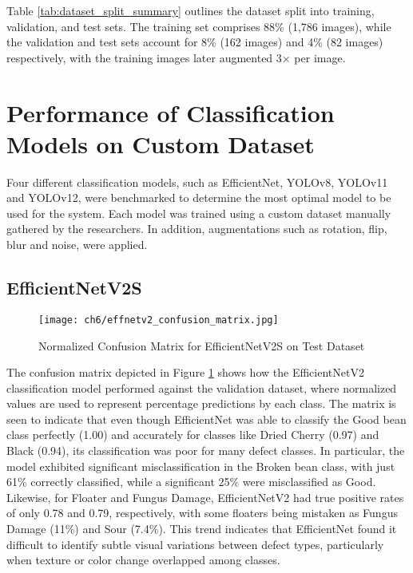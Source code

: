 Table \ref{tab:dataset_split_summary} outlines the dataset split into training, validation, and test sets. The training set comprises 88\% (1,786 images), while the validation and test sets account for 8\% (162 images) and 4\% (82 images) respectively, with the training images later augmented 3× per image.

\section{Performance of Classification Models on Custom Dataset}
\label{sec:perf_custom_dataset}
Four different classification models, such as EfficientNet, YOLOv8, YOLOv11 and YOLOv12, were benchmarked to determine the most optimal model to be used for the system. Each model was trained using a custom dataset manually gathered by the researchers. In addition, augmentations such as rotation, flip, blur and noise, were applied. 

\subsection{EfficientNetV2S}

\begin{figure}[H]
    \centering
    \texttt{[image: ch6/effnetv2\_confusion\_matrix.jpg]} %
    \caption{Normalized Confusion Matrix for EfficientNetV2S on Test Dataset}
    \label{fig:effnetv2s_conf_matrix}
\end{figure}

The confusion matrix depicted in Figure \ref{fig:effnetv2s_conf_matrix} shows how the EfficientNetV2 classification model performed against the validation dataset, where normalized values are used to represent percentage predictions by each class. The matrix is seen to indicate that even though EfficientNet was able to classify the Good bean class perfectly (1.00) and accurately for classes like Dried Cherry (0.97) and Black (0.94), its classification was poor for many defect classes. In particular, the model exhibited significant misclassification in the Broken bean class, with just 61\% correctly classified, while a significant 25\% were misclassified as Good. Likewise, for Floater and Fungus Damage, EfficientNetV2 had true positive rates of only 0.78 and 0.79, respectively, with some floaters being mistaken as Fungus Damage (11\%) and Sour (7.4\%). This trend indicates that EfficientNet found it difficult to identify subtle visual variations between defect types, particularly when texture or color change overlapped among classes. 

